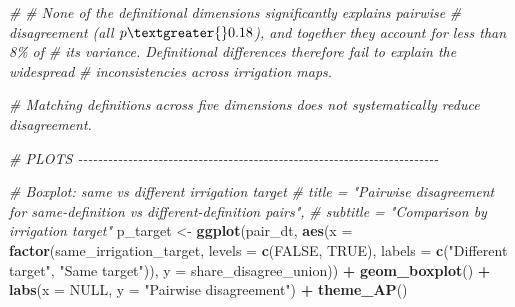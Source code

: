 \documentclass[
  11pt,
]{article}
\newenvironment{Shaded}{\begin{snugshade}}{\end{snugshade}}
\newcommand{\AttributeTok}[1]{\textcolor[rgb]{0.13,0.29,0.53}{#1}}
\newcommand{\CommentTok}[1]{\textcolor[rgb]{0.56,0.35,0.01}{\textit{#1}}}
\newcommand{\ConstantTok}[1]{\textcolor[rgb]{0.56,0.35,0.01}{#1}}
\newcommand{\FunctionTok}[1]{\textcolor[rgb]{0.13,0.29,0.53}{\textbf{#1}}}
\newcommand{\NormalTok}[1]{#1}
\newcommand{\OtherTok}[1]{\textcolor[rgb]{0.56,0.35,0.01}{#1}}
\newcommand{\SpecialCharTok}[1]{\textcolor[rgb]{0.81,0.36,0.00}{\textbf{#1}}}
\newcommand{\StringTok}[1]{\textcolor[rgb]{0.31,0.60,0.02}{#1}}
\begin{document}
\begin{Shaded}
\begin{Highlighting}[]
\CommentTok{\#}
\CommentTok{\# None of the definitional dimensions significantly explains pairwise}
\CommentTok{\# disagreement (all $p \textgreater{} 0.18$), and together they account for less than 8\% of}
\CommentTok{\# its variance. Definitional differences therefore fail to explain the widespread}
\CommentTok{\# inconsistencies across irrigation maps.}

\CommentTok{\# Matching definitions across five dimensions does not systematically reduce disagreement.}

\CommentTok{\# PLOTS {-}{-}{-}{-}{-}{-}{-}{-}{-}{-}{-}{-}{-}{-}{-}{-}{-}{-}{-}{-}{-}{-}{-}{-}{-}{-}{-}{-}{-}{-}{-}{-}{-}{-}{-}{-}{-}{-}{-}{-}{-}{-}{-}{-}{-}{-}{-}{-}{-}{-}{-}{-}{-}{-}{-}{-}{-}{-}{-}{-}{-}{-}{-}{-}{-}{-}{-}{-}{-}{-}{-}{-}}

\CommentTok{\# Boxplot: same vs different irrigation target}
\CommentTok{\# title = "Pairwise disagreement for same{-}definition vs different{-}definition pairs",}
\CommentTok{\# subtitle = "Comparison by irrigation target"}
\NormalTok{p\_target }\OtherTok{\textless{}{-}} \FunctionTok{ggplot}\NormalTok{(pair\_dt, }\FunctionTok{aes}\NormalTok{(}\AttributeTok{x =} \FunctionTok{factor}\NormalTok{(same\_irrigation\_target,}
                                           \AttributeTok{levels =} \FunctionTok{c}\NormalTok{(}\ConstantTok{FALSE}\NormalTok{, }\ConstantTok{TRUE}\NormalTok{),}
                                           \AttributeTok{labels =} \FunctionTok{c}\NormalTok{(}\StringTok{"Different target"}\NormalTok{, }
                                                      \StringTok{"Same target"}\NormalTok{)),}
                                \AttributeTok{y =}\NormalTok{ share\_disagree\_union)) }\SpecialCharTok{+}
  \FunctionTok{geom\_boxplot}\NormalTok{() }\SpecialCharTok{+}
  \FunctionTok{labs}\NormalTok{(}\AttributeTok{x =} \ConstantTok{NULL}\NormalTok{, }\AttributeTok{y =} \StringTok{"Pairwise disagreement"}\NormalTok{) }\SpecialCharTok{+}
  \FunctionTok{theme\_AP}\NormalTok{()}


\end{Highlighting}
\end{Shaded}
\end{document}
